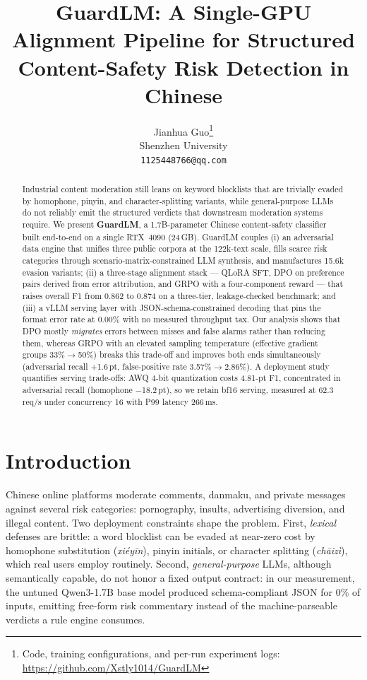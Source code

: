 \documentclass[11pt]{article}
\title{GuardLM: A Single-GPU Alignment Pipeline for Structured\\Content-Safety Risk Detection in Chinese}
\author{Jianhua Guo\thanks{Code, training configurations, and per-run experiment logs: \url{https://github.com/Xstly1014/GuardLM}} \\
  Shenzhen University \\
  \texttt{1125448766@qq.com}}
\begin{document}
\maketitle

\begin{abstract}
Industrial content moderation still leans on keyword blocklists that are trivially evaded by homophone, pinyin, and character-splitting variants, while general-purpose LLMs do not reliably emit the structured verdicts that downstream moderation systems require. We present \textbf{GuardLM}, a 1.7B-parameter Chinese content-safety classifier built end-to-end on a single RTX~4090 (24\,GB). GuardLM couples (i) an adversarial data engine that unifies three public corpora at the 122k-text scale, fills scarce risk categories through scenario-matrix-constrained LLM synthesis, and manufactures 15.6k evasion variants; (ii) a three-stage alignment stack --- QLoRA SFT, DPO on preference pairs derived from error attribution, and GRPO with a four-component reward --- that raises overall F1 from 0.862 to 0.874 on a three-tier, leakage-checked benchmark; and (iii) a vLLM serving layer with JSON-schema-constrained decoding that pins the format error rate at 0.00\% with no measured throughput tax. Our analysis shows that DPO mostly \emph{migrates} errors between misses and false alarms rather than reducing them, whereas GRPO with an elevated sampling temperature (effective gradient groups 33\%$\rightarrow$50\%) breaks this trade-off and improves both ends simultaneously (adversarial recall +1.6\,pt, false-positive rate 3.57\%$\rightarrow$2.86\%). A deployment study quantifies serving trade-offs: AWQ 4-bit quantization costs 4.81-pt F1, concentrated in adversarial recall (homophone $-$18.2\,pt), so we retain bf16 serving, measured at 62.3\,req/s under concurrency 16 with P99 latency 266\,ms.
\end{abstract}

\section{Introduction}

Chinese online platforms moderate comments, danmaku, and private messages against several risk categories: pornography, insults, advertising diversion, and illegal content. Two deployment constraints shape the problem. First, \emph{lexical} defenses are brittle: a word blocklist can be evaded at near-zero cost by homophone substitution (\emph{xiéyīn}), pinyin initials, or character splitting (\emph{chāizì}), which real users employ routinely. Second, \emph{general-purpose} LLMs, although semantically capable, do not honor a fixed output contract: in our measurement, the untuned Qwen3-1.7B base model produced schema-compliant JSON for 0\% of inputs, emitting free-form risk commentary instead of the machine-parseable verdicts a rule engine consumes.
\end{document}
